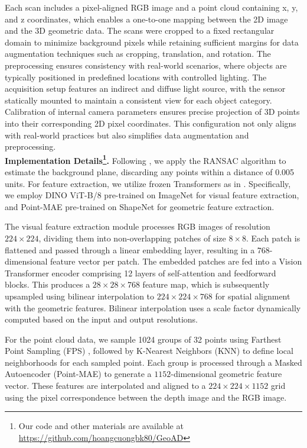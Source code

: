Each scan includes a pixel-aligned RGB image and a point cloud containing x, y, and z coordinates, which enables a one-to-one mapping between the 2D image and the 3D geometric data. The scans were cropped to a fixed rectangular domain to minimize background pixels while retaining sufficient margins for data augmentation techniques such as cropping, translation, and rotation. The preprocessing ensures consistency with real-world scenarios, where objects are typically positioned in predefined locations with controlled lighting. The acquisition setup features an indirect and diffuse light source, with the sensor statically mounted to maintain a consistent view for each object category. Calibration of internal camera parameters ensures precise projection of 3D points into their corresponding 2D pixel coordinates. This configuration not only aligns with real-world practices but also simplifies data augmentation and preprocessing. \\

\noindent \textbf{Implementation Details\footnote{Our code and other materials are available at \url{https://github.com/hoangcuongbk80/GeoAD}}.} Following \cite{wang2023multimodal}, we apply the RANSAC algorithm \cite{fischler1981random} to estimate the background plane, discarding any points within a distance of 0.005 units. For feature extraction, we utilize frozen Transformers as in \cite{wang2023multimodal}. Specifically, we employ DINO ViT-B/8 \cite{dosovitskiy2020image} pre-trained on ImageNet \cite{deng2009imagenet} for visual feature extraction, and Point-MAE \cite{pang2022masked} pre-trained on ShapeNet \cite{chang2015shapenet} for geometric feature extraction. 

The visual feature extraction module processes RGB images of resolution $224 \times 224$, dividing them into non-overlapping patches of size $8 \times 8$. Each patch is flattened and passed through a linear embedding layer, resulting in a $768$-dimensional feature vector per patch. The embedded patches are fed into a Vision Transformer encoder comprising 12 layers of self-attention and feedforward blocks. This produces a $28 \times 28 \times 768$ feature map, which is subsequently upsampled using bilinear interpolation to $224 \times 224 \times 768$ for spatial alignment with the geometric features. Bilinear interpolation uses a scale factor dynamically computed based on the input and output resolutions.

For the point cloud data, we sample 1024 groups of 32 points using Farthest Point Sampling (FPS) \cite{qi2017pointnet++}, followed by K-Nearest Neighbors (KNN) to define local neighborhoods for each sampled point. Each group is processed through a Masked Autoencoder (Point-MAE) \cite{pang2022masked} to generate a $1152$-dimensional geometric feature vector. These features are interpolated and aligned to a $224 \times 224 \times 1152$ grid using the pixel correspondence between the depth image and the RGB image.

